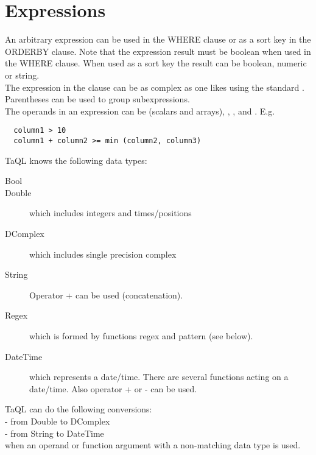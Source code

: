 \section{Expressions}
An arbitrary expression can be used in the WHERE clause or as a sort
key in the ORDERBY clause. Note that the expression result must be
boolean when used in the WHERE clause. When used as a sort key the
result can be boolean, numeric or string.
\\The expression in the clause can be as complex as one likes
using the standard
.
Parentheses can be used to group subexpressions.
\\The operands in an expression can be
 (scalars and arrays),
,
, and
.
E.g.
\begin{verbatim}
  column1 > 10
  column1 + column2 >= min (column2, column3)
\end{verbatim}

TaQL knows the following data types:
\begin{description}
  \item[Bool]
  \item[ Double] which includes integers and times/positions
  \item[ DComplex ] which includes single precision complex
  \item[ String ] Operator + can be used (concatenation).
  \item[ Regex ] which is formed by functions regex and pattern (see below).
  \item[ DateTime ] which represents a date/time. There are several functions
       acting on a date/time. Also operator + or - can be used.
\end{description}
TaQL can do the following conversions:
\\- from Double to DComplex
\\- from String to DateTime
\\when an operand or function argument with a non-matching data type
is used.

\label{TAQL:CONSTANTS}
